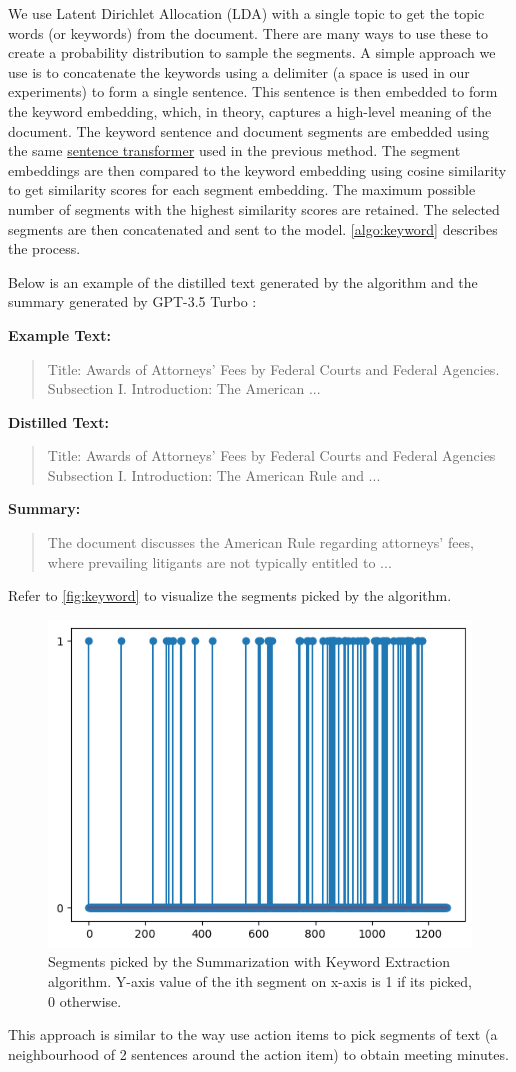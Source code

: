 We use Latent Dirichlet Allocation (LDA) \cite{blei2003latent} with a single topic to get the topic words (or keywords) from the document.
There are many ways to use these to create a probability distribution to sample the segments.
A simple approach we use is to concatenate the keywords using a delimiter (a space is used in our experiments) to form a single sentence.
This sentence is then embedded to form the keyword embedding, which, in theory, captures a high-level meaning of the document.
The keyword sentence and document segments are embedded using the same \href{https://huggingface.co/sentence-transformers/all-MiniLM-L6-v2}{sentence transformer} used in the previous method.
The segment embeddings are then compared to the keyword embedding using cosine similarity to get similarity scores for each segment embedding.
The maximum possible number of segments with the highest similarity scores are retained.
The selected segments are then concatenated and sent to the model.
\autoref{algo:keyword} describes the process.

Below is an example of the distilled text generated by the algorithm and the summary generated by GPT-3.5 Turbo \cite{brown2020language}:

\noindent \textbf{Example Text:}
\begin{quote}
  Title: Awards of Attorneys’ Fees by Federal Courts and Federal Agencies. Subsection I. Introduction: The American ...
\end{quote}

\noindent \textbf{Distilled Text:}
\begin{quote}
  Title: Awards of Attorneys’ Fees by Federal Courts and Federal Agencies Subsection I. Introduction: The American Rule and ...
\end{quote}

\noindent \textbf{Summary:}
\begin{quote}
  The document discusses the American Rule regarding attorneys' fees, where prevailing litigants are not typically entitled to ...
\end{quote}

Refer to \autoref{fig:keyword} to visualize the segments picked by the algorithm.

\begin{figure}
  \centering
  \includegraphics*[width=.45\textwidth]{images/keyword.png}
  \caption{
    Segments picked by the Summarization with Keyword Extraction algorithm.
    Y-axis value of the ith segment on x-axis is 1 if its picked, 0 otherwise.
  }
  \label{fig:keyword}
\end{figure}

This approach is similar to the way \citet{golia2024action} use action items to pick segments of text (a neighbourhood of 2 sentences around the action item) to obtain meeting minutes.
